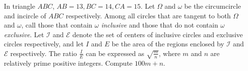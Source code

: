 In triangle $ABC$, $AB=13, BC=14, CA=15$. Let $\Omega$ and $\omega$ be the circumcircle and incircle of $ABC$ respectively. Among all circles that are tangent to both $\Omega$ and $\omega$, call those that contain $\omega$ \emph{inclusive} and those that do not contain $\omega$ \emph{exclusive}. Let $\mathcal{I}$ and $\mathcal{E}$ denote the set of centers of inclusive circles and exclusive circles respectively, and let $I$ and $E$ be the area of the regions enclosed by $\mathcal{I}$ and $\mathcal{E}$ respectively. The ratio $\frac{I}{E}$ can be expressed as $\sqrt{\frac{m}{n}}$, where $m$ and $n$ are relatively prime positive integers. Compute $100m+n$.
